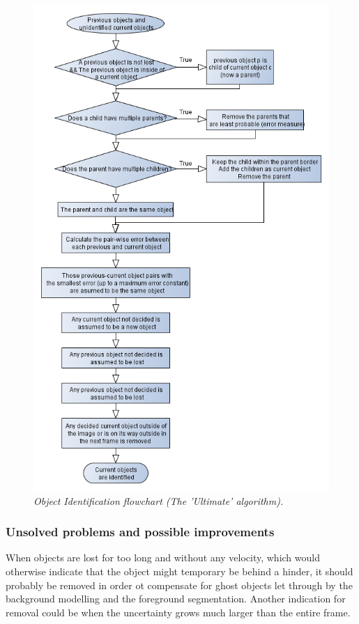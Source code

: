 \newpage
\begin{figure}[htb]
	\centering
	\includegraphics[width=116mm]{images/data_flow_identification.png}
	\caption{\textit{Object Identification flowchart (The 'Ultimate' algorithm).}}
	\label{fig:ObjID_fig} %
\end{figure}

\subsubsection{Unsolved problems and possible improvements}
When objects are lost for too long and without any velocity, which would otherwise indicate that the object might temporary be behind a hinder, it should probably be removed in order ot compensate for ghost objects let through by the background modelling and the foreground segmentation. Another indication for removal could be when the uncertainty grows much larger than the entire frame.